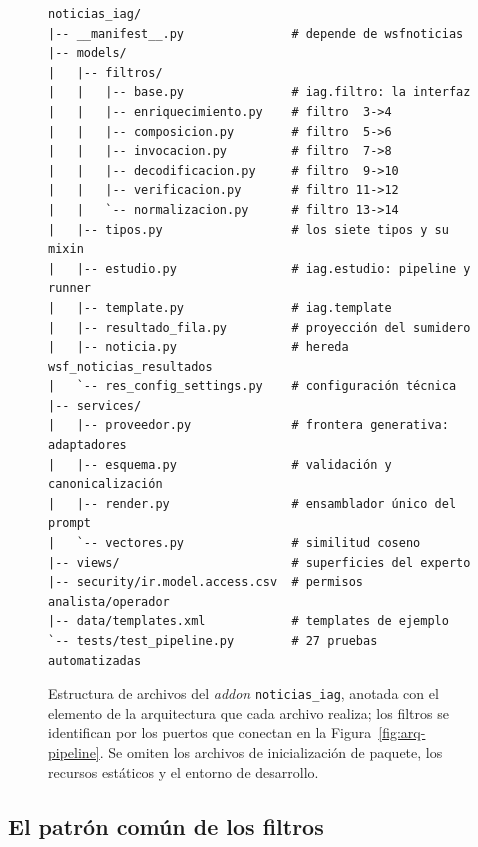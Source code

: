 \documentclass[12pt]{report}
\begin{document}
\begin{figure}[H]
  \centering
  \begin{lstlisting}[style=implbloque]
noticias_iag/
|-- __manifest__.py               # depende de wsfnoticias
|-- models/
|   |-- filtros/
|   |   |-- base.py               # iag.filtro: la interfaz
|   |   |-- enriquecimiento.py    # filtro  3->4
|   |   |-- composicion.py        # filtro  5->6
|   |   |-- invocacion.py         # filtro  7->8
|   |   |-- decodificacion.py     # filtro  9->10
|   |   |-- verificacion.py       # filtro 11->12
|   |   `-- normalizacion.py      # filtro 13->14
|   |-- tipos.py                  # los siete tipos y su mixin
|   |-- estudio.py                # iag.estudio: pipeline y runner
|   |-- template.py               # iag.template
|   |-- resultado_fila.py         # proyección del sumidero
|   |-- noticia.py                # hereda wsf_noticias_resultados
|   `-- res_config_settings.py    # configuración técnica
|-- services/
|   |-- proveedor.py              # frontera generativa: adaptadores
|   |-- esquema.py                # validación y canonicalización
|   |-- render.py                 # ensamblador único del prompt
|   `-- vectores.py               # similitud coseno
|-- views/                        # superficies del experto
|-- security/ir.model.access.csv  # permisos analista/operador
|-- data/templates.xml            # templates de ejemplo
`-- tests/test_pipeline.py        # 27 pruebas automatizadas
\end{lstlisting}
  \caption{Estructura de archivos del \textit{addon} \texttt{noticias\_iag}, anotada con el elemento de la arquitectura que cada archivo realiza; los filtros se identifican por los puertos que conectan en la Figura~\ref{fig:arq-pipeline}. Se omiten los archivos de inicialización de paquete, los recursos estáticos y el entorno de desarrollo.}
  \label{fig:impl-arbol}
\end{figure}

\subsection{El patrón común de los filtros}
\label{sec:impl-mat-patron}
\end{document}
